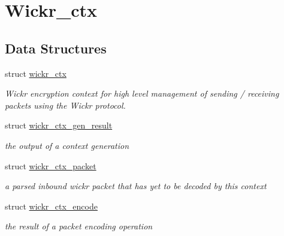 \hypertarget{group__wickr__ctx}{}\section{Wickr\+\_\+ctx}
\label{group__wickr__ctx}
\subsection*{Data Structures}
\begin{DoxyCompactItemize}
\item 
struct \mbox{\hyperlink{structwickr__ctx}{wickr\+\_\+ctx}}
\begin{DoxyCompactList}\small\item\em Wickr encryption context for high level management of sending / receiving packets using the Wickr protocol. \end{DoxyCompactList}\item 
struct \mbox{\hyperlink{structwickr__ctx__gen__result}{wickr\+\_\+ctx\+\_\+gen\+\_\+result}}
\begin{DoxyCompactList}\small\item\em the output of a context generation \end{DoxyCompactList}\item 
struct \mbox{\hyperlink{structwickr__ctx__packet}{wickr\+\_\+ctx\+\_\+packet}}
\begin{DoxyCompactList}\small\item\em a parsed inbound wickr packet that has yet to be decoded by this context \end{DoxyCompactList}\item 
struct \mbox{\hyperlink{structwickr__ctx__encode}{wickr\+\_\+ctx\+\_\+encode}}
\begin{DoxyCompactList}\small\item\em the result of a packet encoding operation \end{DoxyCompactList}\end{DoxyCompactItemize}
